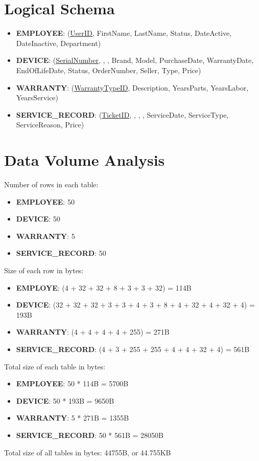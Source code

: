 \documentclass[12pt]{article}
\begin{document}
  \section{Logical Schema}
  \begin{itemize}
    \item[] \textbf{EMPLOYEE}: (\underline{UserID}, FirstName, LastName, Status, DateActive, DateInactive, Department)
    \item[] \textbf{DEVICE}: (\underline{SerialNumber}, , , Brand, Model, PurchaseDate, WarrantyDate, EndOfLifeDate, Status, OrderNumber, Seller, Type, Price)
    \item[] \textbf{WARRANTY}: (\underline{WarrantyTypeID}, Description, YearsParts, YearsLabor, YearsService)
    \item[] \textbf{SERVICE\_RECORD}: (\underline{TicketID}, , , , ServiceDate, ServiceType, ServiceReason, Price)
  \end{itemize}

  \section{Data Volume Analysis}
  Number of rows in each table:
  \begin{itemize}
    \item[] \textbf{EMPLOYEE}: 50
    \item[] \textbf{DEVICE}: 50
    \item[] \textbf{WARRANTY}: 5
    \item[] \textbf{SERVICE\_RECORD}: 50
  \end{itemize}

  Size of each row in bytes:
  \begin{itemize}
    \item[] \textbf{EMPLOYE}: (4 + 32 + 32 + 8 + 3 + 3 + 32) = 114B
    \item[] \textbf{DEVICE}: (32 + 32 + 32 + 3 + 3 + 4 + 3 + 8 + 4 + 32 + 4 + 32 + 4) = 193B
    \item[] \textbf{WARRANTY}: (4 + 4 + 4 + 4 + 255) = 271B
    \item[] \textbf{SERVICE\_RECORD}: (4 + 3 + 255 + 255 + 4 + 4 + 32 + 4) = 561B
  \end{itemize} 

  Total size of each table in bytes:
  \begin{itemize}
    \item[] \textbf{EMPLOYEE}: 50 * 114B = 5700B
    \item[] \textbf{DEVICE}: 50 * 193B = 9650B
    \item[] \textbf{WARRANTY}: 5 * 271B = 1355B
    \item[] \textbf{SERVICE\_RECORD}: 50 * 561B = 28050B
  \end{itemize}

  Total size of all tables in bytes: 44755B, or 44.755KB
\end{document}
